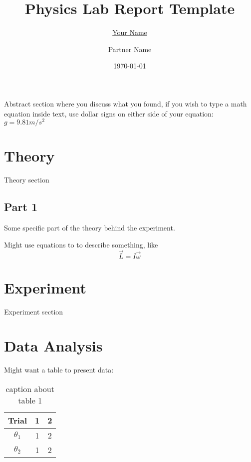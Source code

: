 \documentclass[oneside,letterpaper]{article}   	%
\title{Physics Lab Report Template}
\author{\underline{Your Name} \and Partner Name}
\date{\today}
\begin{document}
\maketitle


\abstract %
Abstract section where you discuss what you found, if you wish to type a math equation inside text, use dollar signs on either side of your equation: $g = 9.81m/s^2$




\section{Theory}
Theory section

\subsection{Part 1}
Some specific part of the theory behind the experiment.
\newline %

\par Might use equations to to describe something, like %
\begin{equation} \vec{L} = I \vec{\omega} \end{equation}


\section{Experiment}
Experiment section



\section{Data Analysis}
Might want a table to present data:

\begin{table}[H]
\centering
\begin{tabular}{|c|c|c|}
	\hline
	Trial & 1 & 2  \\ \hline
	$\theta_1$ & 1 & 2 \\ \hline
	$\theta_2$ & 1 & 2 \\ \hline
	\end{tabular}
	\caption{caption about table 1}
	\label{Table 1}
\end{table}
\end{document}
